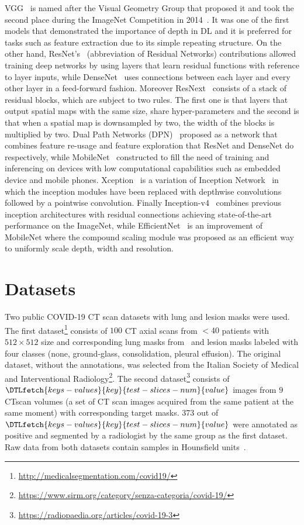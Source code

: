 \documentclass{elsarticle}
\begin{document}
VGG~\cite{simonyan2014very} is named after the Visual Geometry Group that proposed it and took the second place during the ImageNet Competition in 2014~\cite{deng2009imagenet}.
It was one of the first models that demonstrated the importance of depth in DL and it is preferred for tasks such as feature extraction due to its simple repeating structure.
On the other hand, ResNet's~\cite{he2016deep} (abbreviation of Residual Networks) contributions allowed training deep networks by using layers that learn residual functions with reference to layer inputs, while DenseNet~\cite{huang2017densely} uses connections between each layer and every other layer in a feed-forward fashion.
Moreover ResNext~\cite{xie2017aggregated} consists of a stack of residual blocks, which are subject to two rules.
The first one is that layers that output spatial maps with the same size, share hyper-parameters and the second is that when a spatial map is downsampled by two, the width of the blocks is multiplied by two.
Dual Path Networks (DPN)~\cite{chen2017dual} proposed as a network that combines feature re-usage and feature exploration that ResNet and DenseNet do respectively, while MobileNet~\cite{howard2017mobilenets} constructed to fill the need of training and inferencing on devices with low computational capabilities such as embedded device and mobile phones.
Xception~\cite{chollet2017xception} is a variation of Inception Network~\cite{szegedy2015going} in which the inception modules have been replaced with depthwise convolutions followed by a pointwise convolution.
Finally Inception-v4~\cite{szegedy2017inception} combines previous inception architectures with residual connections achieving state-of-the-art performance on the ImageNet, while EfficientNet~\cite{tan2019efficientnet} is an improvement of MobileNet where the compound scaling module was proposed as an efficient way to uniformly scale depth, width and resolution.

\section{Datasets}\label{sec:datasets}
Two public COVID-19 CT scan datasets with lung and lesion masks were used.
The first dataset\footnote{\url{http://medicalsegmentation.com/covid19/}} consists of $100$ CT axial scans from $<40$ patients with $512\times 512$ size and corresponding lung masks from~\cite{hofmanninger2020automatic} and lesion masks labeled with four classes (none, ground-glass, consolidation, pleural effusion).
The original dataset, without the annotations, was selected from the Italian Society of Medical and Interventional Radiology\footnote{\url{https://www.sirm.org/category/senza-categoria/covid-19/}}.
The second dataset\footnote{\url{https://radiopaedia.org/articles/covid-19-3}} consists of $\DTLfetch{keys-values}{key}{test-slices-num}{value}$ images from $9$ CT\@ scan volumes (a set of CT scan images acquired from the same patient at the same moment) with corresponding target masks. %
373 out of $\DTLfetch{keys-values}{key}{test-slices-num}{value}$ were annotated as positive and segmented by a radiologist by the same group as the first dataset.
Raw data from both datasets contain samples in Hounsfield units~\cite{schneider1996calibration}.
\end{document}
